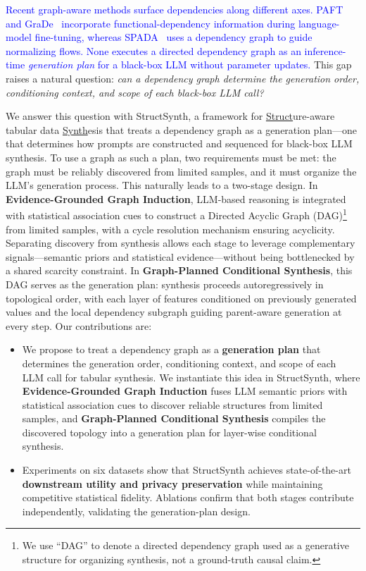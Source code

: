 \textcolor{blue}{Recent graph-aware methods surface dependencies along different axes. PAFT~\cite{xu2024why} and GraDe~\cite{zhang-etal-2025-features} incorporate functional-dependency information during language-model fine-tuning, whereas SPADA~\cite{yang2025doubling} uses a dependency graph to guide normalizing flows. None executes a directed dependency graph as an inference-time \textit{generation plan} for a black-box LLM without parameter updates.}
This gap raises a natural question: \textit{can a dependency graph determine the generation order, conditioning context, and scope of each black-box LLM call?}

We answer this question with \textsf{StructSynth}, a framework for \underline{Struct}ure-aware tabular data \underline{Synth}esis that treats a dependency graph as a generation plan---one that determines how prompts are constructed and sequenced for black-box LLM synthesis.
To use a graph as such a plan, two requirements must be met: the graph must be reliably discovered from limited samples, and it must organize the LLM's generation process. This naturally leads to a two-stage design.
In \textbf{Evidence-Grounded Graph Induction}, LLM-based reasoning is integrated with statistical association cues to construct a Directed Acyclic Graph (DAG)\footnote{We use ``DAG'' to denote a directed dependency graph used as a generative structure for organizing synthesis, not a ground-truth causal claim.} from limited samples, with a cycle resolution mechanism ensuring acyclicity. Separating discovery from synthesis allows each stage to leverage complementary signals---semantic priors and statistical evidence---without being bottlenecked by a shared scarcity constraint.
In \textbf{Graph-Planned Conditional Synthesis}, this DAG serves as the generation plan: synthesis proceeds autoregressively in topological order, with each layer of features conditioned on previously generated values and the local dependency subgraph guiding parent-aware generation at every step.
Our contributions are:
\begin{itemize}[leftmargin=*]
    \item We propose to treat a dependency graph as a \textbf{generation plan} that determines the generation order, conditioning context, and scope of each LLM call for tabular synthesis. We instantiate this idea in \textsf{StructSynth}, where \textbf{Evidence-Grounded Graph Induction} fuses LLM semantic priors with statistical association cues to discover reliable structures from limited samples, and \textbf{Graph-Planned Conditional Synthesis} compiles the discovered topology into a generation plan for layer-wise conditional synthesis.
    \item Experiments on six datasets show that \textsf{StructSynth} achieves state-of-the-art \textbf{downstream utility and privacy preservation} while maintaining competitive statistical fidelity. Ablations confirm that both stages contribute independently, validating the generation-plan design.
\end{itemize}
